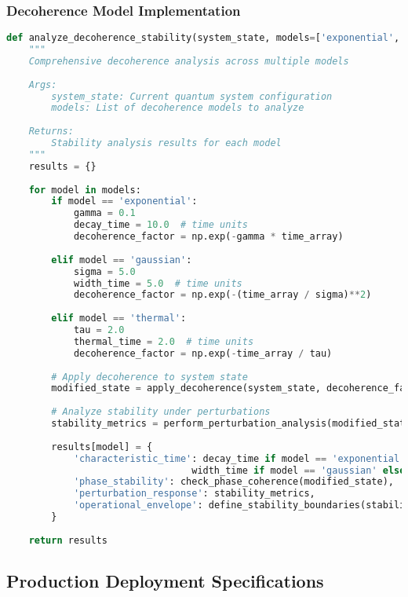 \documentclass[11pt]{article}
\begin{document}
\subsubsection{Decoherence Model Implementation}
\begin{lstlisting}[language=Python, caption=Decoherence Analysis Implementation]
def analyze_decoherence_stability(system_state, models=['exponential', 'gaussian', 'thermal']):
    """
    Comprehensive decoherence analysis across multiple models
    
    Args:
        system_state: Current quantum system configuration
        models: List of decoherence models to analyze
        
    Returns:
        Stability analysis results for each model
    """
    results = {}
    
    for model in models:
        if model == 'exponential':
            gamma = 0.1
            decay_time = 10.0  # time units
            decoherence_factor = np.exp(-gamma * time_array)
            
        elif model == 'gaussian':
            sigma = 5.0
            width_time = 5.0  # time units
            decoherence_factor = np.exp(-(time_array / sigma)**2)
            
        elif model == 'thermal':
            tau = 2.0
            thermal_time = 2.0  # time units
            decoherence_factor = np.exp(-time_array / tau)
        
        # Apply decoherence to system state
        modified_state = apply_decoherence(system_state, decoherence_factor)
        
        # Analyze stability under perturbations
        stability_metrics = perform_perturbation_analysis(modified_state)
        
        results[model] = {
            'characteristic_time': decay_time if model == 'exponential' else 
                                 width_time if model == 'gaussian' else thermal_time,
            'phase_stability': check_phase_coherence(modified_state),
            'perturbation_response': stability_metrics,
            'operational_envelope': define_stability_boundaries(stability_metrics)
        }
    
    return results
\end{lstlisting}

\subsection{Production Deployment Specifications}
\end{document}
